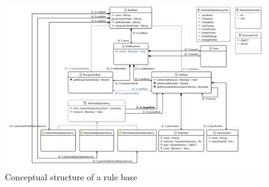 \begin{figure}[h!]
\centering
\includegraphics[width=\textwidth]{images/architecture/rulebase_model}
\caption{Conceptual structure of a rule base}
\end{figure}


